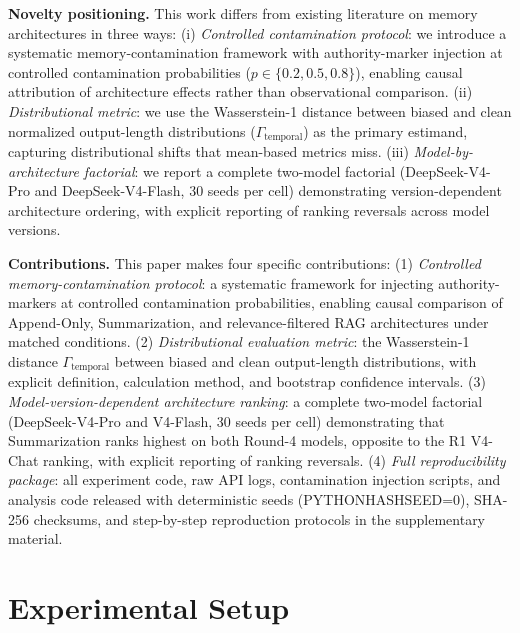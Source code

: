 \documentclass[11pt]{article}
\begin{document}


\textbf{Novelty positioning.} This work differs from existing literature on memory architectures in three ways: (i) \emph{Controlled contamination protocol}: we introduce a systematic memory-contamination framework with authority-marker injection at controlled contamination probabilities ($p \in \{0.2, 0.5, 0.8\}$), enabling causal attribution of architecture effects rather than observational comparison. (ii) \emph{Distributional metric}: we use the Wasserstein-1 distance between biased and clean normalized output-length distributions ($\Gamma_{\text{temporal}}$) as the primary estimand, capturing distributional shifts that mean-based metrics miss. (iii) \emph{Model-by-architecture factorial}: we report a complete two-model factorial (DeepSeek-V4-Pro and DeepSeek-V4-Flash, 30 seeds per cell) demonstrating version-dependent architecture ordering, with explicit reporting of ranking reversals across model versions.



\textbf{Contributions.} This paper makes four specific contributions: (1) \emph{Controlled memory-contamination protocol}: a systematic framework for injecting authority-markers at controlled contamination probabilities, enabling causal comparison of Append-Only, Summarization, and relevance-filtered RAG architectures under matched conditions. (2) \emph{Distributional evaluation metric}: the Wasserstein-1 distance $\Gamma_{\text{temporal}}$ between biased and clean output-length distributions, with explicit definition, calculation method, and bootstrap confidence intervals. (3) \emph{Model-version-dependent architecture ranking}: a complete two-model factorial (DeepSeek-V4-Pro and V4-Flash, 30 seeds per cell) demonstrating that Summarization ranks highest on both Round-4 models, opposite to the R1 V4-Chat ranking, with explicit reporting of ranking reversals. (4) \emph{Full reproducibility package}: all experiment code, raw API logs, contamination injection scripts, and analysis code released with deterministic seeds (PYTHONHASHSEED=0), SHA-256 checksums, and step-by-step reproduction protocols in the supplementary material.\section{Experimental Setup}
\label{sec:experimental-setup}
\end{document}
